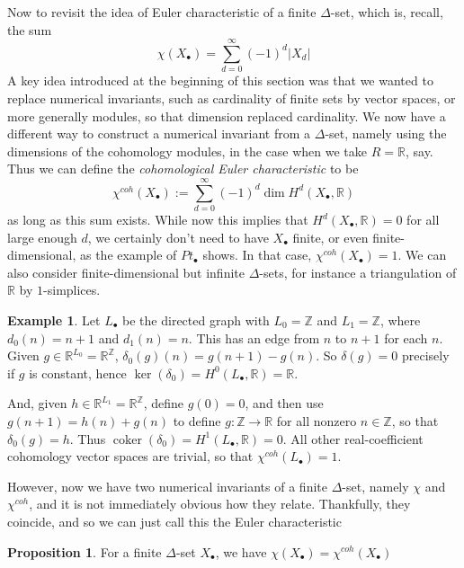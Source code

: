 \documentclass{tufte-handout}
\def\RR{\mathbb{R}}
\def\ZZ{\mathbb{Z}}
\DeclareMathOperator{\coker}{coker}
\theoremstyle{definition}
\newtheorem{prop}{Proposition}
\newtheorem{example}{Example}
\begin{document}
Now to revisit the idea of Euler characteristic of a finite $\Delta$-set, which is, recall, the
sum
\[
	\chi(X_\bullet) = \sum_{d=0}^\infty (-1)^d |X_d|
\]
A key idea introduced at the beginning of this section was that we wanted to replace numerical invariants,
such as cardinality of finite sets by vector spaces, or more generally modules, so that dimension replaced
cardinality. We now have a different way to construct a numerical invariant from a $\Delta$-set, namely
using the dimensions of the cohomology modules, in the case when we take $R = \RR$, say.
Thus we can define the \emph{cohomological Euler characteristic} to be
\[
	\chi^{coh}(X_\bullet) := \sum_{d=0}^\infty (-1)^d \dim H^d(X_\bullet,\RR)
\]
as long as this sum exists. While now this implies that $H^d(X_\bullet,\RR)=0$ for all large enough $d$,
we certainly don't need to have $X_\bullet$ finite, or even finite-dimensional, as the example of $Pt_\bullet$ shows. In that case, $\chi^{coh}(X_\bullet) = 1$.
We can also consider finite-dimensional but infinite $\Delta$-sets, for instance a triangulation of $\RR$ by $1$-simplices.

\begin{example}
Let $L_\bullet$ be the directed graph with $L_0 = \ZZ$ and $L_1 = \ZZ$, where $d_0(n) = n+1$ and $d_1(n) = n$.
This has an edge from $n$ to $n+1$ for each $n$. Given $g\in \RR^{L_0} = \RR^\ZZ$, 
$\delta_0(g)(n) = g(n+1) - g(n)$. So $\delta(g) = 0$ precisely if $g$ is constant, hence $\ker(\delta_0) = H^0(L_\bullet,\RR) = \RR$.

And, given $h\in \RR^{L_1} = \RR^\ZZ$, define $g(0) = 0$, and then use $g(n+1) = h(n) + g(n)$ to
define $g\colon \ZZ\to \RR$ for all nonzero $n\in\ZZ$, so that $\delta_0(g) = h$. Thus $\coker(\delta_0) = H^1(L_\bullet,\RR) = 0$. All other real-coefficient cohomology vector spaces are trivial,
so that $\chi^{coh}(L_\bullet) = 1$.
\end{example}

However, now we have two numerical invariants of a finite $\Delta$-set, namely $\chi$ and $\chi^{coh}$,
and it is not immediately obvious how they relate. Thankfully, they coincide, and so we can just call
this the Euler characteristic

\begin{prop}
For a finite $\Delta$-set $X_\bullet$, we have $\chi(X_\bullet) = \chi^{coh}(X_\bullet)$
\end{prop}
\end{document}
